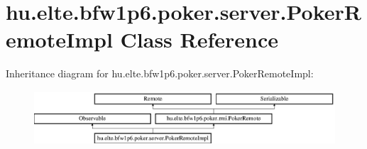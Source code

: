 \hypertarget{classhu_1_1elte_1_1bfw1p6_1_1poker_1_1server_1_1_poker_remote_impl}{}\section{hu.\+elte.\+bfw1p6.\+poker.\+server.\+Poker\+Remote\+Impl Class Reference}
\label{classhu_1_1elte_1_1bfw1p6_1_1poker_1_1server_1_1_poker_remote_impl}
Inheritance diagram for hu.\+elte.\+bfw1p6.\+poker.\+server.\+Poker\+Remote\+Impl\+:\begin{figure}[H]
\begin{center}
\leavevmode
\includegraphics[height=2.000000cm]{classhu_1_1elte_1_1bfw1p6_1_1poker_1_1server_1_1_poker_remote_impl}
\end{center}
\end{figure}
